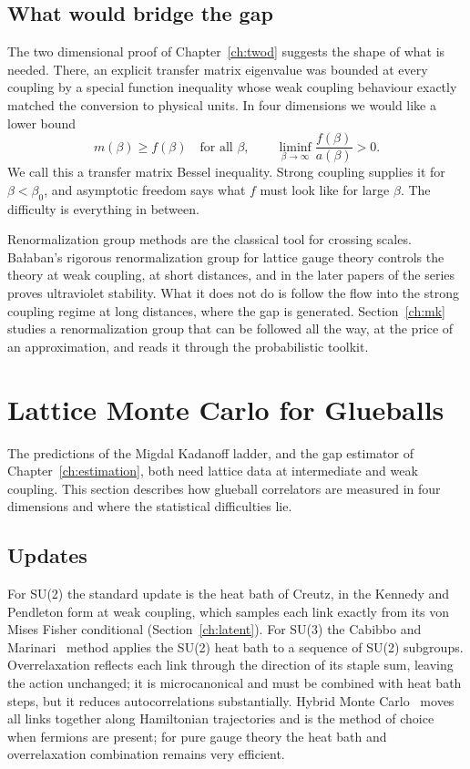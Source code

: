 \subsection{What would bridge the gap}

The two dimensional proof of Chapter~\ref{ch:twod} suggests the shape of what is needed. There, an explicit transfer matrix eigenvalue was bounded at every coupling by a special function inequality whose weak coupling behaviour exactly matched the conversion to physical units. In four dimensions we would like a lower bound
\[
m(\beta)\ge f(\beta)\quad\text{for all }\beta,\qquad\liminf_{\beta\to\infty}\frac{f(\beta)}{a(\beta)}>0 .
\]
We call this a transfer matrix Bessel inequality. Strong coupling supplies it for $\beta<\beta_0$, and asymptotic freedom says what $f$ must look like for large $\beta$. The difficulty is everything in between.

Renormalization group methods are the classical tool for crossing scales. Ba\l aban's rigorous renormalization group for lattice gauge theory\cite{Ba87} controls the theory at weak coupling, at short distances, and in the later papers of the series proves ultraviolet stability. What it does not do is follow the flow into the strong coupling regime at long distances, where the gap is generated. Section~\ref{ch:mk} studies a renormalization group that can be followed all the way, at the price of an approximation, and reads it through the probabilistic toolkit.

\section{Lattice Monte Carlo for Glueballs}\label{ch:latticemc}

The predictions of the Migdal Kadanoff ladder, and the gap estimator of Chapter~\ref{ch:estimation}, both need lattice data at intermediate and weak coupling. This section describes how glueball correlators are measured in four dimensions and where the statistical difficulties lie.

\subsection{Updates}

For SU(2) the standard update is the heat bath of Creutz\cite{Cr80}, in the Kennedy and Pendleton form\cite{KP85} at weak coupling, which samples each link exactly from its von Mises Fisher conditional (Section~\ref{ch:latent}). For SU(3) the Cabibbo and Marinari~\cite{CM82} method applies the SU(2) heat bath to a sequence of SU(2) subgroups. Overrelaxation reflects each link through the direction of its staple sum, leaving the action unchanged; it is microcanonical and must be combined with heat bath steps, but it reduces autocorrelations substantially. Hybrid Monte Carlo~\cite{DKPR87} moves all links together along Hamiltonian trajectories and is the method of choice when fermions are present; for pure gauge theory the heat bath and overrelaxation combination remains very efficient.

